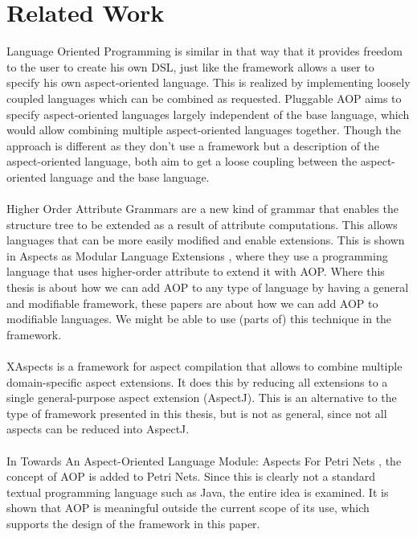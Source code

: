 \documentclass[a4paper]{report}
\begin{document}
\chapter{Related Work}
\label{chap:RelatedWork}
Language Oriented Programming \citep{dmitriev_language_2004} is similar in that way that it provides freedom to the user to create his own DSL, just like the framework allows a user to specify his own aspect-oriented language. This is realized by implementing loosely coupled languages which can be combined as requested. Pluggable AOP \citep{kojarski_pluggable_2005} aims to specify aspect-oriented languages largely independent of the base language, which would allow combining multiple aspect-oriented languages together.  Though the approach is different as they don't use a framework but a description of the aspect-oriented language, both aim to get a loose coupling between the aspect-oriented language and the base language.\\
\\
Higher Order Attribute Grammars \citep{vogt_higher_1989} are a new kind of grammar that enables the structure tree to be extended as a result of attribute computations. This allows languages that can be more easily modified and enable extensions. This is shown in Aspects as Modular Language Extensions \citep{van_wyk_aspects_2003}, where they use a programming language that uses higher-order attribute to extend it with AOP. Where this thesis is about how we can add AOP to any type of language by having a general and modifiable framework, these papers are about how we can add AOP to modifiable languages. We might be able to use (parts of) this technique in the framework.\\
\\
XAspects \citep{shonle_xaspects:_2003} is a framework for aspect compilation that allows to combine multiple domain-specific aspect extensions. It does this by reducing all extensions to a single general-purpose aspect extension (AspectJ). This is an alternative to the type of framework presented in this thesis, but is not as general, since not all aspects can be reduced into AspectJ.\\
\\
In Towards An Aspect-Oriented Language Module: Aspects For Petri Nets \citep{molderez_towards_2012}, the concept of AOP is added to Petri Nets. Since this is clearly not a standard textual programming language such as Java, the entire idea is examined. It is shown that AOP is meaningful outside the current scope of its use, which supports the design of the framework in this paper.
\end{document}
